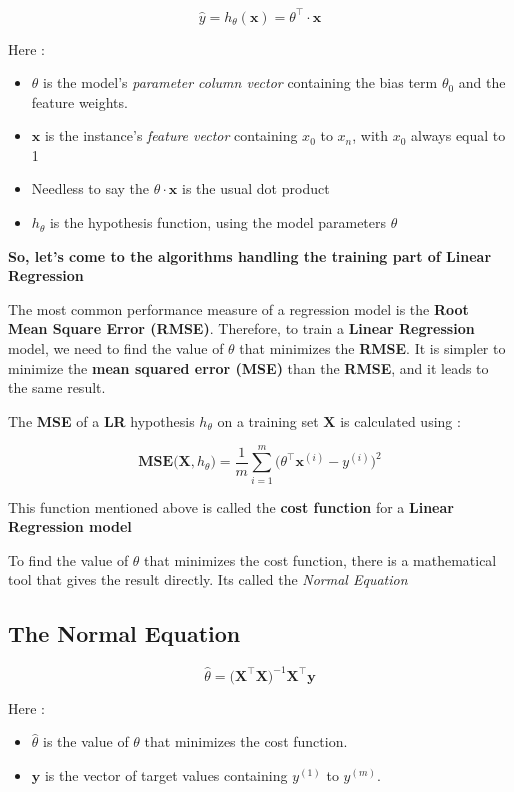 \documentclass[11pt, a4paper]{book}
\begin{document}
\[\hat{y} = h_{\theta}(\textbf{x}) = \theta^{\intercal}\cdot\textbf{x}\]

Here :

\begin{itemize}
\item
  \(\theta\) is the model's \emph{parameter column vector} containing
  the bias term \(\theta_{0}\) and the feature weights.
\item
  \(\textbf{x}\) is the instance's \emph{feature vector} containing
  \(x_{0}\) to \(x_{n}\), with \(x_{0}\) always equal to 1
\item
  Needless to say the \(\theta\cdot\textbf{x}\) is the usual dot product
\item
  \(h_{\theta}\) is the hypothesis function, using the model parameters
  \(\theta\)
\end{itemize}

\textbf{So, let's come to the algorithms handling the training part of
Linear Regression}

The most common performance measure of a regression model is the
\textbf{Root Mean Square Error (RMSE)}. Therefore, to train a
\textbf{Linear Regression} model, we need to find the value of
\(\theta\) that minimizes the \textbf{RMSE}. It is simpler to minimize
the \textbf{mean squared error (MSE)} than the \textbf{RMSE}, and it
leads to the same result.

The \textbf{MSE} of a \textbf{LR} hypothesis \(h_{\theta}\) on a
training set \(\mathbf{X}\) is calculated using :

\[\mathbf{MSE(X},h_{\theta}) = \frac{1}{m}\sum_{i=1}^{m} \Bigg( \theta^{\intercal}\mathbf{x}^{(i)} - y^{(i)} \Bigg)^2\]

This function mentioned above is called the \textbf{cost function} for a
\textbf{Linear Regression model}

To find the value of \(\theta\) that minimizes the cost function, there
is a mathematical tool that gives the result directly. Its called the
\emph{Normal Equation}

\hypertarget{the-normal-equation}{%
\subsection{The Normal Equation}\label{the-normal-equation}}

\[\hat{\theta} = \Big( \mathbf{X^{\intercal}X} \Big)^{-1} \mathbf{X^{\intercal}}\textbf{y}\]

Here :

\begin{itemize}
\item
  \(\hat{\theta}\) is the value of \(\theta\) that minimizes the cost
  function.
\item
  \(\mathbf{y}\) is the vector of target values containing \(y^{(1)}\)
  to \(y^{(m)}\).
\end{itemize}
\end{document}
